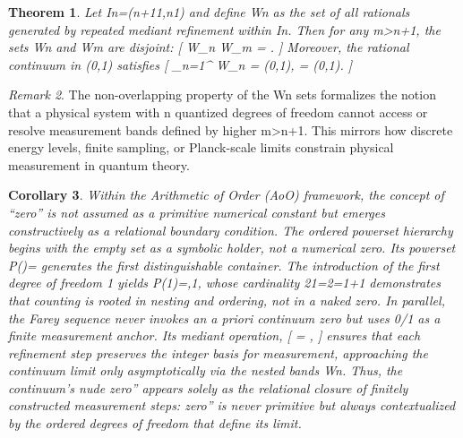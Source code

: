 \documentclass[12pt,a4paper]{article}
\newtheorem{theorem}{Theorem}[section]
\newtheorem{corollary}[theorem]{Corollary}
\theoremstyle{definition}
\theoremstyle{remark}
\newtheorem{remark}[theorem]{Remark}
\begin{document}
\begin{theorem}
Let In​=(n+11​,n1​) and define Wn​ as the set of all rationals generated by repeated mediant refinement within In​. Then for any m>n+1, the sets Wn​ and Wm​ are disjoint:
[
W_n \cap W_m = \emptyset.
]
Moreover, the rational continuum in (0,1) satisfies
[
\bigcup_{n=1}^{\infty} W_n =  \cap (0,1),
\quad {} \quad
{} = (0,1).
]
\end{theorem}
\begin{remark}
The non-overlapping property of the Wn​ sets formalizes the notion that a physical system with n quantized degrees of freedom cannot access or resolve measurement bands defined by higher m>n+1. This mirrors how discrete energy levels, finite sampling, or Planck-scale limits constrain physical measurement in quantum theory.
\end{remark}
\begin{corollary}
Within the Arithmetic of Order (AoO) framework, the concept of ``zero'' is not assumed as a primitive numerical constant but emerges constructively as a relational boundary condition. The ordered powerset hierarchy begins with the empty set {} as a symbolic holder, not a numerical zero. Its powerset P({})={{}} generates the first distinguishable container. The introduction of the first degree of freedom {1} yields P({1})={{},{1}}, whose cardinality 21=2=1+1 demonstrates that counting is rooted in nesting and ordering, not in a naked zero.
In parallel, the Farey sequence never invokes an a priori continuum zero but uses 0/1 as a finite measurement anchor. Its mediant operation,
[
 \oplus {} = ,
]
ensures that each refinement step preserves the integer basis for measurement, approaching the continuum limit only asymptotically via the nested bands Wn​.
Thus, the continuum’s nude zero'' appears solely as the relational closure of finitely constructed measurement steps: zero'' is never primitive but always contextualized by the ordered degrees of freedom that define its limit.
\end{corollary}
\end{document}
